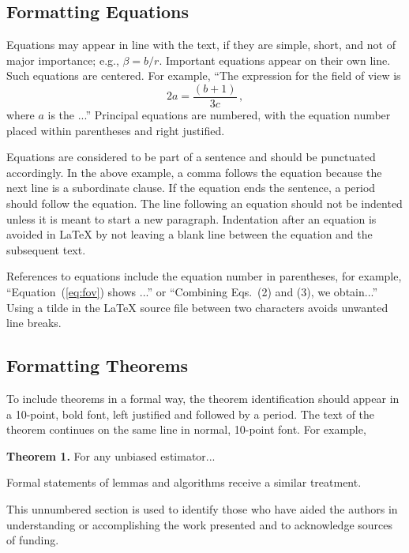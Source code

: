 \documentclass[nocompress]{spie}  %
\begin{document}
\subsection{Formatting Equations}
Equations may appear in line with the text, if they are simple, short, and not of major importance; e.g., $\beta = b/r$.  Important equations appear on their own line.  Such equations are centered.  For example, ``The expression for the field of view is
\begin{equation}
\label{eq:fov}
2 a = \frac{(b + 1)}{3c} \, ,
\end{equation}
where $a$ is the ...'' Principal equations are numbered, with the equation number placed within parentheses and right justified.  

Equations are considered to be part of a sentence and should be punctuated accordingly. In the above example, a comma follows the equation because the next line is a subordinate clause.  If the equation ends the sentence, a period should follow the equation.  The line following an equation should not be indented unless it is meant to start a new paragraph.  Indentation after an equation is avoided in LaTeX by not leaving a blank line between the equation and the subsequent text.

References to equations include the equation number in parentheses, for example, ``Equation~(\ref{eq:fov}) shows ...'' or ``Combining Eqs.~(2) and (3), we obtain...''  Using a tilde in the LaTeX source file between two characters avoids unwanted line breaks.

\subsection{Formatting Theorems}

To include theorems in a formal way, the theorem identification should appear in a 10-point, bold font, left justified and followed by a period.  The text of the theorem continues on the same line in normal, 10-point font.  For example, 

\noindent\textbf{Theorem 1.} For any unbiased estimator...

Formal statements of lemmas and algorithms receive a similar treatment.

\acknowledgments %
 
This unnumbered section is used to identify those who have aided the authors in understanding or accomplishing the work presented and to acknowledge sources of funding.  

\end{document}
